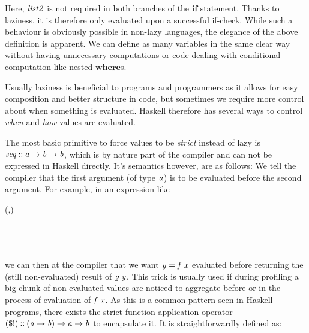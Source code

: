 \documentclass[paper=A4,twoside=true,openright,parskip=full,chapterprefix=true,headings=normal,bibliography=totoc,listof=totoc,titlepage=on,captions=tableabove,draft=false,british]{scrreprt}%
\begin{document}
Here, \ensuremath{\Varid{list2}} is not required in both branches of the \ensuremath{\mathbf{if}} statement.
Thanks to laziness, it is therefore only evaluated upon a successful
if-check. While such a behaviour is obviously possible in non-lazy
languages, the elegance of the above definition is apparent. We can
define as many variables in the same clear way without having
unnecessary computations or code dealing with conditional computation
like nested \ensuremath{\mathbf{where}}s.

Usually laziness is beneficial to programs and programmers as it allows
for easy composition and better structure in code, but sometimes we
require more control about when something is evaluated. Haskell
therefore has several ways to control \emph{when} and \emph{how} values
are evaluated.

The most basic primitive to force values to be \emph{strict} instead of
lazy is \ensuremath{\Varid{seq}\mathbin{::}\Varid{a}\to \Varid{b}\to \Varid{b}}, which is by nature part of the compiler
and can not be expressed in Haskell directly. It's semantics however,
are as follows: We tell the compiler that the first argument (of type
\ensuremath{\Varid{a}}) is to be evaluated before the second argument. For example, in an
expression like


\begin{hscode}\SaveRestoreHook
{}%
%
%
%
\>[B]{}\mathbin{::}\to (,){}\<[E]%
\\
\>[B]{}\;\mathrel{=}\;\mathrel{=}\;\;\;\;\<[E]%
\\
\>[B]{}\<[5]%
\>[5]{}\<[E]%
\\
\>[5]{}\<[9]%
\>[9]{}\mathrel{=}\<[E]%
\\
\>[5]{}\<[9]%
\>[9]{}\mathrel{=}\<[E]%
\ColumnHook
\end{hscode}\resethooks
\vspace{-2\baselineskip}

we can then at the compiler that we want \ensuremath{\Varid{y}\mathrel{=}\Varid{f}\;\Varid{x}} evaluated before
returning the (still non-evaluated) result of \ensuremath{\Varid{g}\;\Varid{y}}. This trick is
usually used if during profiling a big chunk of non-evaluated values are
noticed to aggregate before or in the process of evaluation of \ensuremath{\Varid{f}\;\Varid{x}}. As
this is a common pattern seen in Haskell programs, there exists the
strict function application operator \ensuremath{(\mathbin{\$!})\mathbin{::}(\Varid{a}\to \Varid{b})\to \Varid{a}\to \Varid{b}} to
encapsulate it. It is straightforwardly defined as:
\end{document}
